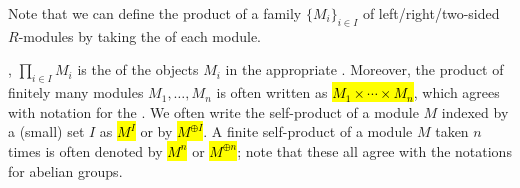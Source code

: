 \begin{definition}
    Note that we can define the product of a family $\{M_i\}_{i \in I}$ of left/right/two-sided $R$-modules by taking the  of each module.

    , $\prod_{i \in I} M_i$ is the  of the objects $M_i$ in the appropriate . Moreover, the product of finitely many modules $M_1,\ldots,M_n$ is often written as \hl{$M_1 \times \cdots \times M_n$}, which agrees with notation for the . We often write the self-product of a module $M$ indexed by a (small) set $I$ as \hl{$M^I$} or by \hl{$M^{\oplus I}$}. A finite self-product of a module $M$ taken $n$ times is often denoted by \hl{$M^n$} or \hl{$M^{\oplus n}$}; note that these all agree with the notations for abelian groups.
\end{definition}
